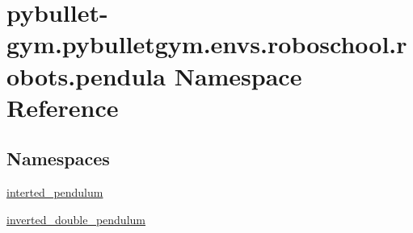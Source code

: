 \hypertarget{namespacepybullet-gym_1_1pybulletgym_1_1envs_1_1roboschool_1_1robots_1_1pendula}{}\section{pybullet-\/gym.pybulletgym.\+envs.\+roboschool.\+robots.\+pendula Namespace Reference}
\label{namespacepybullet-gym_1_1pybulletgym_1_1envs_1_1roboschool_1_1robots_1_1pendula}
\subsection*{Namespaces}
\begin{DoxyCompactItemize}
\item 
 \hyperlink{namespacepybullet-gym_1_1pybulletgym_1_1envs_1_1roboschool_1_1robots_1_1pendula_1_1interted__pendulum}{interted\+\_\+pendulum}
\item 
 \hyperlink{namespacepybullet-gym_1_1pybulletgym_1_1envs_1_1roboschool_1_1robots_1_1pendula_1_1inverted__double__pendulum}{inverted\+\_\+double\+\_\+pendulum}
\end{DoxyCompactItemize}
